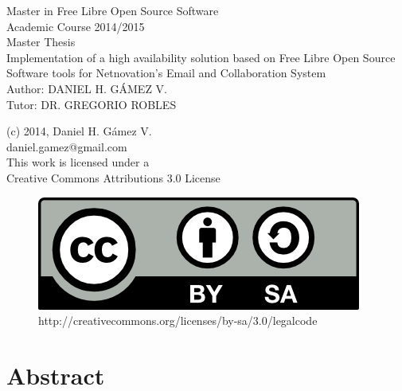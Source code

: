 \documentclass[a4paper, 12pt]{book}
\begin{document}
\begin{titlepage}
\begin{center}
  \Large
  Master in Free Libre Open Source Software\\
  \vspace{0.2cm}
  \large
  Academic Course 2014/2015 \\
  \vspace{0.4cm}
  Master Thesis \\
  \vspace{1cm}
  \LARGE
  Implementation of a high availability solution based on Free Libre Open Source Software tools for Netnovation's Email and Collaboration System \\
  \vspace{2cm}
  \large
  Author: DANIEL H. G\'{A}MEZ V.\\
  Tutor: DR. GREGORIO ROBLES
  
  \end{center}
\end{titlepage}

%
{\raggedleft
(c) 2014, Daniel H. G\'{a}mez V.\\
 daniel.gamez@gmail.com\\
 This work is licensed under a\\
 Creative Commons Attributions 3.0 License
  \begin{figure}[H]
    {\raggedleft
    \includegraphics[scale=0.80]{by-sa.png}\\
    \hfill http://creativecommons.org/licenses/by-sa/3.0/legalcode
    }
  \label{fig:logo}
  \end{figure}
}

%
\chapter*{Abstract}
\label{chap:abstract}
\end{document}
